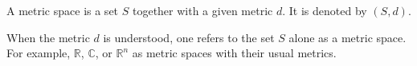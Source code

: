 A metric space is a set $S$ together with a given metric $d$. It is denoted by $(S, d)$.

When the metric $d$ is understood, one refers to the set $S$ alone as a metric space. For example, $\mathbb{R}$, $\mathbb{C}$, or $\mathbb{R}^n$ as metric spaces with their usual metrics.
